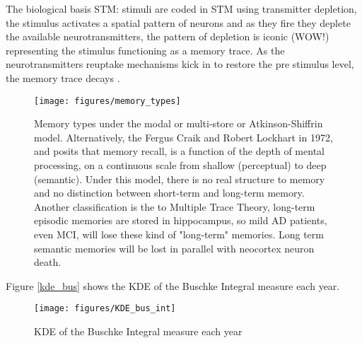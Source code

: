 \documentclass[9pt,twocolumn,twoside]{pnas-new}
\begin{document}
The biological basis STM: stimuli are coded in STM using transmitter depletion, the stimulus activates a spatial pattern of neurons and as they fire they deplete the available neurotransmitters, the pattern of depletion is iconic (WOW!) representing the stimulus functioning as a memory trace. As the neurotransmitters reuptake mechanisms kick in to restore the pre stimulus level, the memory trace decays \cite{grossberg1971pavlovian}.

\begin{figure}[H]
        \centering
        \texttt{[image: figures/memory\_types]}
        \caption{Memory types under the modal or multi-store or Atkinson-Shiffrin model. Alternatively, the Fergus Craik and Robert Lockhart in 1972, and posits that memory recall, is a function of the depth of mental processing, on a continuous scale from shallow (perceptual) to deep (semantic). Under this model, there is no real structure to memory and no distinction between short-term and long-term memory. Another classification is the to Multiple Trace Theory, long-term episodic memories are stored in hippocampus, so mild AD patients, even MCI, will lose these kind of "long-term" memories. Long term semantic memories will be lost in parallel with neocortex neuron death.
        } 
        \label{fig:b}
\end{figure}

Figure \ref{kde_bus} shows the KDE of the Buschke Integral measure each year.

\begin{figure}[H]
        \centering
        \texttt{[image: figures/KDE\_bus\_int]}
        \caption{KDE of the Buschke Integral measure each year
        } 
        \label{fig:kde_bus}
\end{figure}
\end{document}
